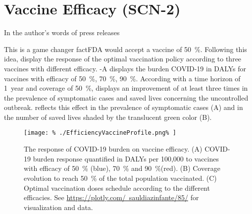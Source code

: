 \section*{Vaccine Efficacy (SCN-2)}
    In the author's words of press releases
    \begin{quotation}

    \end{quotation}
    This is a game changer fact\textemdash FDA would accept a vaccine of
    \SI{50}{\percent}. Following this idea,
    display the response of the optimal vaccination policy according to three
    vaccines with different efficacy. -A
    displays the burden COVID-19 in DALYs for vaccines with
    efficacy of \SI{50}{\percent}, \SI{70}{\percent}, \SI{90}{\percent}.
    According with a time horizon of \SI{1}{year} and coverage of
    \SI{50}{\percent},  displays an
    improvement of at least three times in the prevalence of symptomatic cases
    and saved lives concerning the uncontrolled
    outbreak.  reflects this
    effect in the prevalence of symptomatic cases (A) and in
    the number of saved lives shaded by the translucent green color (B).
%
%
    \begin{figure*}[htb]
        \centering
        \texttt{[image: \%
            ./EfficiencyVaccineProfile.png\%
        ]}
        \caption[The response of COVID-19 on vaccine efficacy]{
            The response of COVID-19 burden on vaccine efficacy.
            (A) COVID-19 burden response quantified in DALYs per 100,000 to
            vaccines with efficacy of \SI{50}{\percent} (blue),
            \SI{70}{\percent} and \SI{90}{\percent}(red).
            (B) Coverage evolution to reach \SI{50}{\percent} of the total
            population vaccinated.
            (C) Optimal vaccination doses schedule according to the
            different efficacies. See
            \href{https://plotly.com/~sauldiazinfante/85/}{%
                https://plotly.com/~sauldiazinfante/85/} for
            visualization and data.
        }
        \label{fig:efficiencyvaccineprofile}
    \end{figure*}
